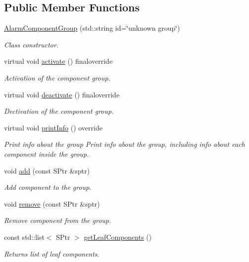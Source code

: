 \subsection*{Public Member Functions}
\begin{DoxyCompactItemize}
\item 
\hyperlink{classAlarmComponentGroup_af999ab1dac77f573df01fb400ec5d044}{Alarm\+Component\+Group} (std\+::string id=\char`\"{}unknown group\char`\"{})
\begin{DoxyCompactList}\small\item\em Class constructor. \end{DoxyCompactList}\item 
virtual void \hyperlink{classAlarmComponentGroup_ac67076993e9068dc15e8d39af29698a4}{activate} () finaloverride
\begin{DoxyCompactList}\small\item\em Activation of the component group. \end{DoxyCompactList}\item 
virtual void \hyperlink{classAlarmComponentGroup_a673cebdc7e32c522af0e7435786ea118}{deactivate} () finaloverride
\begin{DoxyCompactList}\small\item\em Dectivation of the component group. \end{DoxyCompactList}\item 
virtual void \hyperlink{classAlarmComponentGroup_a07b07cb3f5b41360e3aaf83b9d0938b1}{print\+Info} () override\hypertarget{classAlarmComponentGroup_a07b07cb3f5b41360e3aaf83b9d0938b1}{}\label{classAlarmComponentGroup_a07b07cb3f5b41360e3aaf83b9d0938b1}

\begin{DoxyCompactList}\small\item\em Print info about the group Print info about the group, including info about each component inside the group. \end{DoxyCompactList}\item 
void \hyperlink{classAlarmComponentGroup_a8e6775dd15144e3a09396cfd5592779c}{add} (const S\+Ptr \&sptr)
\begin{DoxyCompactList}\small\item\em Add component to the group. \end{DoxyCompactList}\item 
void \hyperlink{classAlarmComponentGroup_a39378037a74da6477fb01f2965fe67da}{remove} (const S\+Ptr \&sptr)
\begin{DoxyCompactList}\small\item\em Remove component from the group. \end{DoxyCompactList}\item 
const std\+::list$<$ S\+Ptr $>$ \hyperlink{classAlarmComponentGroup_a5d2444572da09104bc5d9640db533324}{get\+Leaf\+Components} ()
\begin{DoxyCompactList}\small\item\em Returns list of leaf components. \end{DoxyCompactList}\end{DoxyCompactItemize}
